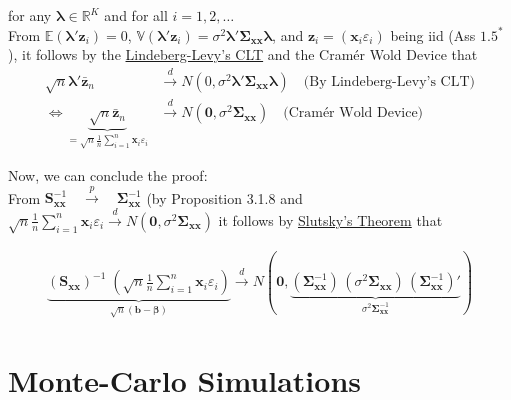 \documentclass[]{book}
\theoremstyle{definition}
\theoremstyle{definition}
\theoremstyle{definition}
\theoremstyle{remark}
\begin{document}
for any \(\boldsymbol{\lambda}\in\mathbb{R}^{K}\) and for all
\(i=1,2,\dots\)\\
From \(\mathbb{E}(\boldsymbol{\lambda}'\mathbf{z}_i)=0\),
\(\mathbb{V}(\boldsymbol{\lambda}'\mathbf{z}_i)=\sigma^2\boldsymbol{\lambda}'\boldsymbol{\Sigma}_{\mathbf{x}\mathbf{x}}\boldsymbol{\lambda}\),
and \(\mathbf{z}_i=(\mathbf{x}_i\varepsilon_i)\) being iid (Ass
\(1.5^\ast\)), it follows by the \href{https://www.statlect.com/asymptotic-theory/central-limit-theorem}{Lindeberg-Levy's CLT}
and the Cramér Wold Device that \[\begin{align*}
\sqrt{n}\boldsymbol{\lambda}'\bar{\mathbf{z}}_n&\overset{d}\longrightarrow N(0,\sigma^2\boldsymbol{\lambda}'\boldsymbol{\Sigma}_{\mathbf{x}\mathbf{x}}\boldsymbol{\lambda})\quad\text{(By Lindeberg-Levy's CLT)}\\
\Leftrightarrow
\underbrace{\sqrt{n}\bar{\mathbf{z}}_n}_{=\sqrt{n}\frac{1}{n}\sum_{i=1}^n\mathbf{x}_i\varepsilon_i}&\overset{d}\longrightarrow N(\mathbf{0},\sigma^2\boldsymbol{\Sigma}_{\mathbf{x}\mathbf{x}})\quad\text{(Cramér Wold Device)}\end{align*}\]

Now, we can conclude the proof:\\
From
\(\mathbf{S}_{\mathbf{x}\mathbf{x}}^{-1}\quad\overset{p}\longrightarrow \quad\boldsymbol{\Sigma}_{\mathbf{x}\mathbf{x}}^{-1}\)
(by Proposition 3.1.8 and\\
\(\sqrt{n}\frac{1}{n}\sum_{i=1}^n\mathbf{x}_i\varepsilon_i\overset{d}\longrightarrow N(\mathbf{0},\sigma^2\boldsymbol{\Sigma}_{\mathbf{x}\mathbf{x}})\)
it follows by \href{https://www.statlect.com/asymptotic-theory/Slutsky-theorem}{Slutsky's Theorem}
that

\begin{align*}
\underbrace{\left(\mathbf{S}_{\mathbf{x}\mathbf{x}}\right)^{-1}\;\left(\sqrt{n}\frac{1}{n}\sum_{i=1}^n\mathbf{x}_i\varepsilon_i\right)}_{\sqrt{n}(\mathbf{b}-\boldsymbol{\beta})}\overset{d}\longrightarrow N\left(\mathbf{0},\underbrace{(\boldsymbol{\Sigma}_{\mathbf{x}\mathbf{x}}^{-1})\,(\sigma^2\boldsymbol{\Sigma}_{\mathbf{x}\mathbf{x}})\,(\boldsymbol{\Sigma}_{\mathbf{x}\mathbf{x}}^{-1})'}_{\sigma^2\boldsymbol{\Sigma}^{-1}_{\mathbf{x}\mathbf{x}}}\right)
\end{align*}

\hypertarget{monte-carlo-simulations}{%
\chapter{Monte-Carlo Simulations}\label{monte-carlo-simulations}}
\end{document}
